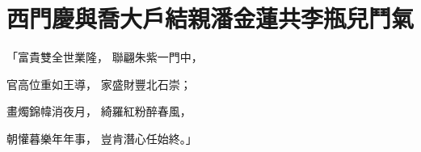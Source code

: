 %

\chapter{西門慶與喬大戶結親\KG 潘金蓮共李瓶兒鬥氣}


\begin{showcontents}{}



「富貴雙全世業隆，  聯翩朱紫一門中，

官高位重如王導，  家盛財豐北石崇；

畫燭錦幃消夜月，  綺羅紅粉醉春風，

朝懽暮樂年年事，  豈肯潛心任始終。」


\end{showcontents}
